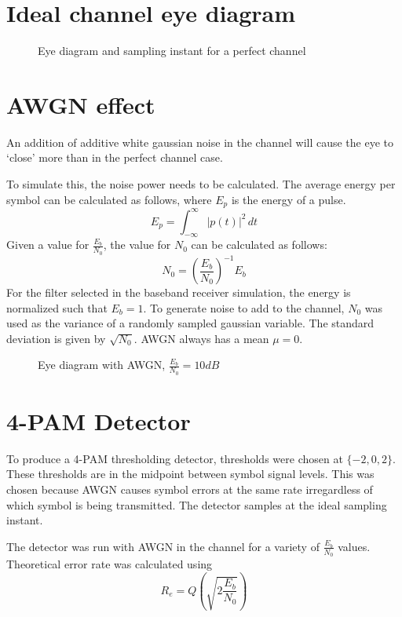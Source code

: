 \documentclass[11pt]{article}
\begin{document}
\section{Ideal channel eye diagram}
\begin{figure}[H]
    \centering
    \scalebox{0.7}{}
    \caption{Eye diagram and sampling instant for a perfect channel}
\end{figure}

\section{AWGN effect}
An addition of additive white gaussian noise in the channel will cause the eye
to `close' more than in the perfect channel case.

To simulate this, the noise power needs to be calculated. The average energy per
symbol can be calculated as follows, where $E_p$ is the energy of a pulse.
\begin{equation}
    E_p = \int_{-\infty}^{\infty} |p(t)|^2 \,dt
\end{equation}
Given a value for $\frac{E_b}{N_0}$, the value for $N_0$ can be calculated as
follows:
\begin{equation}
    N_0 = \left(\frac{E_b}{N_0} \right)^{-1} E_b
\end{equation}
For the filter selected in the baseband receiver simulation, the energy is
normalized such that $E_b = 1$. To generate noise to add to the channel, $N_0$
was used as the variance of a randomly sampled gaussian variable. The standard
deviation is given by $\sqrt{N_0}$. AWGN always has a mean $\mu = 0$.

\begin{figure}[H]
    \centering
    \scalebox{0.7}{}
    \caption{Eye diagram with AWGN, $\frac{E_b}{N_0} = 10dB$}
\end{figure}

\section{4-PAM Detector}
To produce a 4-PAM thresholding detector, thresholds were chosen at $\{-2, 0,
    2\}$. These thresholds are in the midpoint between symbol signal levels.
This was chosen because AWGN causes symbol errors at the same rate irregardless
of which symbol is being transmitted. The detector samples at the ideal sampling
instant.


The detector was run with AWGN in the channel for a variety of $\frac{E_b}{N_0}$
values. Theoretical error rate was calculated using
\begin{equation}
    R_e = Q\left( \sqrt{2 \frac{E_b}{N_0}}\right)
\end{equation}
\end{document}

